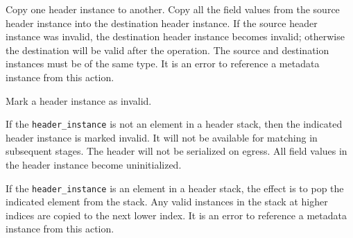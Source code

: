 \documentclass[12pt]{article}
\begin{document}

{ %
Copy one header instance to another.
}
{ %
}
{ %
Copy all the field values from the source header instance into the destination
header instance. If the source header instance was invalid, the destination
header instance becomes invalid; otherwise the destination will be valid
after the operation. The source and destination instances must be of the
same type.
It is an error to reference a metadata instance from this action.
}


{ %
Mark a header instance as invalid.
}
{ %
}
{ %
If the \texttt{header_instance} is not an element in a header stack, then the indicated
header instance is marked invalid. It will not be available for matching in
subsequent \matchaction stages. The header will not be serialized on egress.
All field values in the header instance become uninitialized.

If the \texttt{header_instance} is an element in a header stack, the effect is to
pop the indicated element from the stack. Any valid instances in the stack
at higher indices are copied to the next lower index.
It is an error to reference a metadata instance from this action.
}

\end{document}
